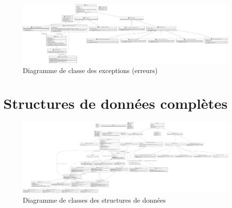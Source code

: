 {	\begin{figure}[H]
		\centerline{
			\includegraphics[width=1.15\textwidth,keepaspectratio]{../diagrams-simplified/class/exceptions/lutin-compiler-class-diagram-exceptions-uml.png}
		}	
		\caption{Diagramme de classe des exceptions (erreurs)}
		\label{fig:erreur-structure}
	\end{figure}		
	
	\section{Structures de données complètes}
	\label{sec:full-structure}
	
	\begin{figure}[H]
		\centerline{
			\includegraphics[width=1.15\textwidth,keepaspectratio]{../diagrams/class/lutin-compiler-class-diagram-uml.png}
		}	
		\label{fig:full-structure}
		\caption{Diagramme de classes des structures de données}
	\end{figure}

	\clearpage
	\recalctypearea
}



